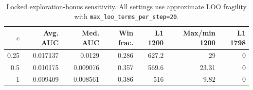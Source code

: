 \begin{table}[htbp]
\centering
\small
\caption{Locked exploration-bonus sensitivity. All settings use approximate LOO fragility with \texttt{max\_loo\_terms\_per\_step=20}.}
\label{tab:exploration-bonus-sensitivity}
\begin{tabular}{rrrrrrr}
\toprule
$c$ & Avg. AUC & Med. AUC & Win frac. & L1 1200 & Max/min 1200 & L1 1798 \\
\midrule
0.25 & 0.017137 & 0.0129 & 0.286 & 627.2 & 29 & 0 \\
0.5 & 0.010175 & 0.009076 & 0.357 & 569.6 & 23.31 & 0 \\
1 & 0.009409 & 0.008561 & 0.386 & 516 & 9.82 & 0 \\
\bottomrule
\end{tabular}
\end{table}
